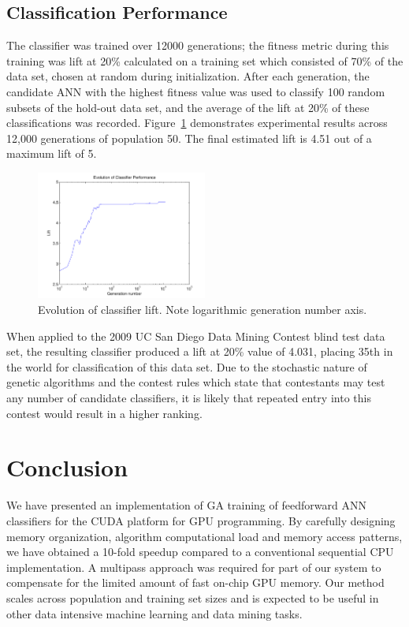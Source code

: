 \documentclass[11pt]{article}       %
\begin{document}
\subsection{Classification Performance} \label{results}
The classifier was trained over 12000 generations; the fitness metric during this training was lift at 20\% calculated on a training set which consisted of 70\% of the data set, chosen at random during initialization.  After each generation, the candidate ANN with the highest fitness value was used to classify 100 random subsets of the hold-out data set, and the average of the lift at 20\% of these classifications was recorded.  Figure~\ref{fig:evolution-lift} demonstrates experimental results across 12,000 generations of population 50. The final estimated lift is 4.51 out of a maximum lift of 5.

\begin{figure}[h]
	\centering
	\includegraphics[width=0.5\textwidth]{fig-evolution-lift}
	\caption{Evolution of classifier lift. Note logarithmic generation number axis.}
	\label{fig:evolution-lift}
\end{figure}

When applied to the 2009 UC San Diego Data Mining Contest blind test data set, the resulting classifier produced a lift at 20\% value of 4.031, placing 35th in the world for classification of this data set. Due to the stochastic nature of genetic algorithms and the contest rules which state that contestants may test any number of candidate classifiers, it is likely that repeated entry into this contest would result in a higher ranking.
\section{Conclusion} \label{concl}
We have presented an implementation of GA training of feedforward ANN classifiers for the CUDA platform for GPU programming. By carefully designing memory organization, algorithm computational load and memory access patterns, we have obtained a 10-fold speedup compared to a conventional sequential CPU implementation. A multipass approach was required for part of our system to compensate for the limited amount of fast on-chip GPU memory. Our method scales across population and training set sizes and is expected to be useful in other data intensive machine learning and data mining tasks.
\end{document}
